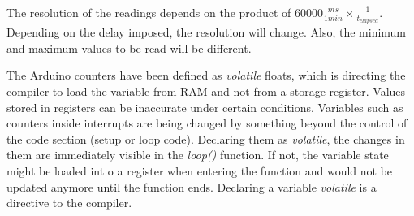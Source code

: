 \documentclass[a4paper]{article}
\begin{document}
The resolution of the readings depends on the product of $60000\frac{ms}{1min} \times \frac{1}{t_{elapsed}}$. Depending on the delay imposed, the resolution will change. Also, the minimum and maximum values to be read will be different.


The Arduino counters have been defined as \textit{volatile}\cite{volatiles} floats, which is directing the compiler to load the variable from RAM and not from a storage register. Values stored in registers can be inaccurate under certain conditions. Variables such as counters inside interrupts are being changed by something beyond the control of the code section (setup or loop code). Declaring them as \textit{volatile}, the changes in them are immediately visible in the \textit{loop()} function. If not, the variable state might be loaded int o a register when entering the function and would not be updated anymore until the function ends. 
Declaring a variable \textit{volatile} is a directive to the compiler.
\end{document}
